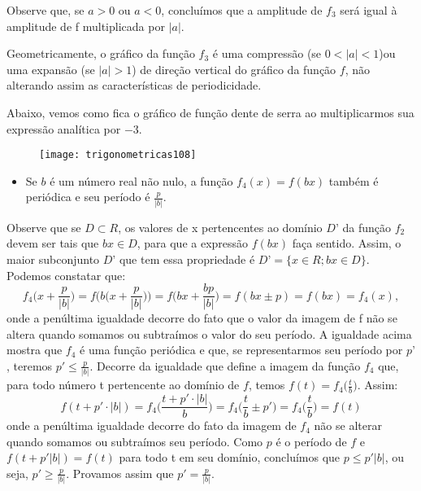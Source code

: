 Observe que, se $a >0$ ou $a < 0$, concluímos que a amplitude de $f_3$ será igual à amplitude de f multiplicada por $|a|$.

Geometricamente, o gráfico da função $f_3$ é uma compressão (se $0<|a|<1$)ou uma expansão (se $|a|>1$) de direção vertical do gráfico da função $f$, não alterando assim as características de periodicidade.

Abaixo, vemos como fica o gráfico de função dente de serra ao multiplicarmos sua expressão analítica por $-3$.

\begin{figure}[H]
\centering

\texttt{[image: trigonometricas108]}
\end{figure}

\begin{itemize}
\item Se $b$ é um número real não nulo, a função $f_4(x) = f(bx)$ também é periódica e seu período é $\frac{p}{|b|}$.
\end{itemize}

Observe que se $D\subset R$, os valores de x pertencentes ao domínio $D’$ da função $f_2$ devem ser tais que $bx\in D$, para que a expressão $f(bx)$ faça sentido. Assim, o maior subconjunto $D’$ que tem essa propriedade é $D’ = \{x \in R;bx\in D\}$.
 Podemos constatar que:
\begin{equation*}
f_4 \bigg(x+\frac{p}{|b|}\bigg)=f\bigg(b\bigg(x+\frac{p}{|b|}\bigg)\bigg)=f\bigg(bx+\frac{bp}{|b|}\bigg)=f(bx\pm p)=f(bx)=f_4 (x),
\end{equation*}
onde a penúltima igualdade decorre do fato que o valor da imagem de f não se altera quando somamos ou subtraímos o valor do seu período. A igualdade acima mostra que $f_4$ é uma função periódica e que, se representarmos seu período por $p’$, teremos $p'\leq \frac{p}{|b|}$. Decorre da igualdade que define a imagem da função $f_4$ que, para todo número t pertencente ao domínio de $f$, temos $f(t) =f_4 \big(\frac{t}{b}\big)$. Assim:
\begin{equation*}
f(t+p'\cdot|b|)=f_4 \bigg(\frac{t+p'\cdot|b|}{b}\bigg)=f_4 \bigg(\frac{t}{b}\pm p'\bigg)=f_4 \bigg(\frac{t}{b}\bigg)=f(t)
\end{equation*}
onde a penúltima igualdade decorre do fato da imagem de $f_4$ não se alterar quando somamos ou subtraímos seu período. Como $p$ é o período de $f$ e $f(t+p'|b|)= f(t)$ para todo t em seu domínio, concluímos que $p\leq p'|b|$, ou seja, $p'\geq \frac{p}{|b|}$. Provamos assim que $p'=\frac{p}{|b|}$.

